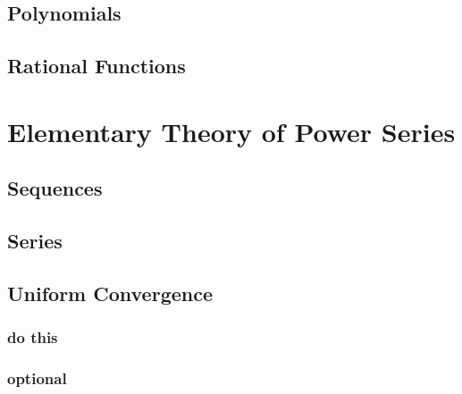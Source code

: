 \subsection{Polynomials}

\subsection{Rational Functions}
\subsubsection{}
\subsubsection{}
\subsubsection{}
\subsubsection{}
\subsubsection{}
\subsubsection{}

\section{Elementary Theory of Power Series}
\subsection{Sequences}

\subsection{Series}

\subsection{Uniform Convergence}
\subsubsection{do this}
\subsubsection{optional}
